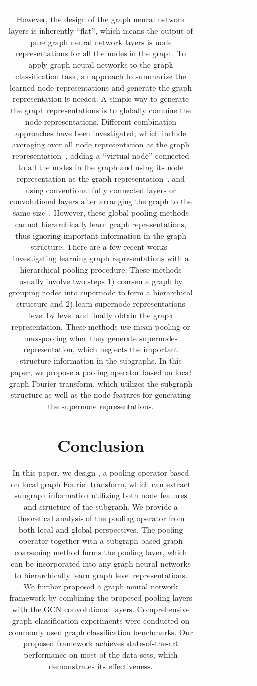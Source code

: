\documentclass[sigconf]{acmart}
\begin{document}
{\begin{table}
\begin{center}
\begin{tabular} { c c c c c c c c }
However, the design of the graph neural network layers is inherently ``flat'', which means the output of pure graph neural network layers is node representations for all the nodes in the graph. To apply graph neural networks to the graph classification task, an approach to summarize the learned node representations and generate the graph representation is needed. A simple way to generate the graph representations is to globally combine the node representations. Different combination approaches have been investigated, which include averaging over all node representation as the graph representation~\cite{duvenaud2015convolutional}, adding a ``virtual node'' connected to all the nodes in the graph and using its node representation as the graph representation~\cite{li2015gated}, and using conventional fully connected layers or convolutional layers after arranging the graph to the same size~\cite{zhang2018end,gilmer2017neural}. However, these global pooling methods cannot hierarchically learn graph representations, thus ignoring important information in the graph structure. There are a few recent works~\cite{defferrard2016convolutional,ying2018hierarchical,simonovsky2017dynamic,fey2018splinecnn} investigating learning graph representations with a hierarchical pooling procedure. These methods usually involve two steps 1) coarsen a graph by grouping nodes into supernode to form a hierarchical structure and 2) learn supernode representations level by level and finally obtain the graph representation. These methods use mean-pooling or max-pooling when they generate supernodes representation, which neglects the important structure information in the subgraphs. In this paper, we propose a pooling operator based on local graph Fourier transform, which utilizes the subgraph structure as well as the node features for generating the supernode representations. \section{Conclusion} \label{sec:conlcusion}
In this paper, we design , a pooling operator based on local graph Fourier transform, which can extract subgraph information utilizing both node features and structure of the subgraph. We provide a theoretical analysis of the pooling operator from both local and global perspectives. The pooling operator together with a subgraph-based graph coarsening method forms the pooling layer, which can be incorporated into any graph neural networks to hierarchically learn graph level representations. We further proposed a graph neural network framework  by combining the proposed pooling layers with the GCN convolutional layers. Comprehensive graph classification experiments were conducted on  commonly used graph classification benchmarks. Our proposed framework achieves state-of-the-art performance on most of the data sets, which demonstrates its effectiveness. 



\end{tabular}
\end{center}
\end{table}}
\end{document}
